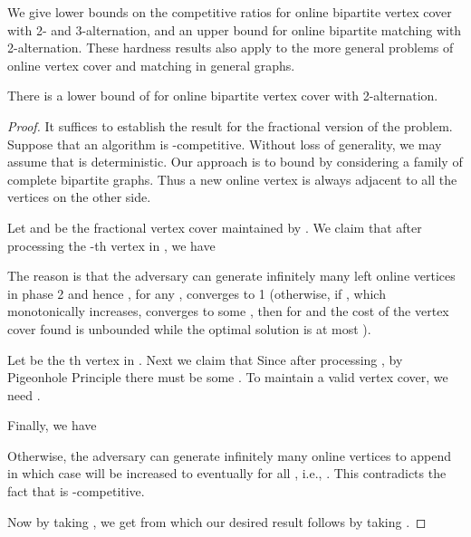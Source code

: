 \documentclass{article}
\begin{document}
We give lower bounds on the competitive ratios for online bipartite vertex cover with 2- and 3-alternation, and an upper bound for online bipartite matching with 2-alternation. These hardness results also apply to the more general problems of online vertex cover and matching in general graphs.
\begin{proposition}
There is a lower bound of 
for online bipartite vertex cover with 2-alternation.
\end{proposition}
\begin{proof}
It suffices to establish the result for the fractional version of the problem. Suppose that an algorithm  is -competitive. 
Without loss of generality, we may assume that  is deterministic.
Our approach is to bound  by considering a family of complete bipartite graphs. Thus a new online vertex is always adjacent to all the vertices on the other side.

Let  and  be the fractional vertex cover maintained by . 
We claim that after processing the -th vertex in , we have
 
The reason is that the adversary can generate infinitely many left online vertices in phase 2 and hence , for any , converges to 1 (otherwise, if , which monotonically increases, converges to some , then  for  and the cost of the vertex cover found is unbounded while the optimal solution is at most ).


Let  be the th vertex in . Next we claim that  Since  after processing , by Pigeonhole Principle there must be some . To maintain a valid vertex cover, we need .

Finally, we have 

Otherwise, the adversary can generate infinitely many online vertices to append  in which case 
 will be increased to  eventually for all , i.e., .
This contradicts the fact that  is -competitive.

Now by taking , we get
from which our desired result follows by taking .
\end{proof}
\end{document}
